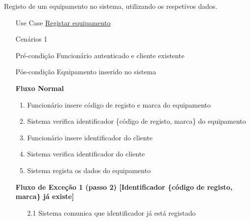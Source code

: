 \documentclass[../relatorio.tex]{subfiles}
\begin{document}
Registo de um equipamento no sistema, utilizando os respetivos dados.
\begin{itemize}
    \item[Use Case] {\underline{Registar equipamento}}
    \item[Cenários] {1}
    \item[Pré-condição] {Funcionário autenticado e cliente existente}
    \item[Pós-condição] {Equipamento inserido no sistema}
          \begin{flushleft}
              \textbf{Fluxo Normal}
          \end{flushleft}
          \begin{enumerate}
              \item Funcionário insere código de registo e marca do equipamento
              \item Sistema verifica identificador \{código de registo, marca\} do equipamento
              \item Funcionário insere identificador do cliente
              \item Sistema verifica identificador do cliente
              \item Sistema regista os dados do equipamento
          \end{enumerate}
          \begin{flushleft}
            \textbf{Fluxo de Exceção 1 (passo 2) [Identificador \{código de registo, marca\} já existe]}
        \end{flushleft}
        \begin{itemize}
            \item[2.1]{Sistema comunica que identificador já está registado}
        \end{itemize}
\end{itemize}
\end{document}
